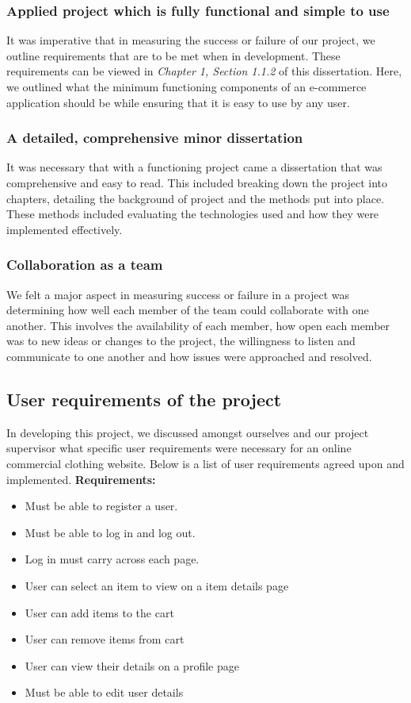 \subsubsection{Applied project which is fully functional and simple to use}
It was imperative that in measuring the success or failure of our project, we outline requirements that are to be met when in development. These requirements can be viewed in \textit{Chapter 1, Section 1.1.2} of this dissertation. Here, we outlined what the minimum functioning components of an e-commerce application should be while ensuring that it is easy to use by any user. 

\subsubsection{A detailed, comprehensive minor dissertation} It was necessary that with a functioning project came a dissertation that was comprehensive and easy to read. This included breaking down the project into chapters, detailing the background of project and the methods put into place. These methods included evaluating the technologies used and how they were implemented effectively.

\subsubsection{Collaboration as a team}
We felt a major aspect in measuring success or failure in a project was determining how well each member of the team could collaborate with one another. This involves the availability of each member, how open each member was to new ideas or changes to the project, the willingness to listen and communicate to one another and how issues were approached and resolved. 

\subsection{User requirements of the project}
In developing this project, we discussed amongst ourselves and our project supervisor what specific user requirements were necessary for an online commercial clothing website. Below is a list of user requirements agreed upon and implemented.
\newline
\newline
\newpage
\textbf{Requirements:}
\begin{itemize}
  \item Must be able to register a user.
  \item Must be able to log in and log out.
  \item Log in must carry across each page.
  \item User can select an item to view on a item details page
  \item User can add items to the cart
  \item User can remove items from cart
  \item User can view their details on a profile page
  \item Must be able to edit user details
\end{itemize}

